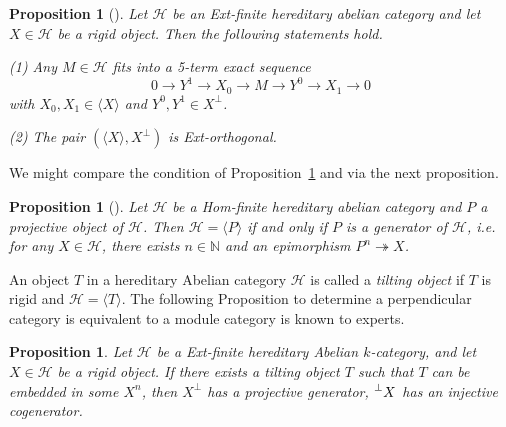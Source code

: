 \documentclass[a4paper, 11pt, reqno]{amsart}
\numberwithin{equation}{section}
\newtheorem{prop}[thm]{Proposition}
\theoremstyle{remark}
\theoremstyle{definition}
\begin{document}
\begin{prop}[{\cite[Proposition 3.3]{cheng2024wide}}] \label{perp_cal}
   Let $\mathcal H$ be an Ext-finite hereditary abelian category and let $X \in \mathcal H$ be a rigid object. Then the following statements hold. 
   
   (1) Any $M \in \mathcal H$ fits into a 5-term exact sequence
   \[
   0 \to Y^1 \to X_0 \to M \to Y^0 \to X_1 \to 0
   \]
   with $X_0,X_1 \in \langle X \rangle$ and $Y^0,Y^1 \in X^{\perp}$. 
   
   (2) The pair $(\langle X \rangle,X^{\perp})$ is Ext-orthogonal.
\end{prop}

We might compare the condition of Proposition~\ref{perp_cal} and  \cite[Proposition~A.1]{hubery2016categorification} via the next proposition.

\begin{prop} [{\cite[Proposition 3.6]{cheng2024wide}}] \label{proj_gen}
   Let $\mathcal H$ be a Hom-finite hereditary abelian category and $P$ a projective object of $\mathcal H$. Then $\mathcal H=\langle P \rangle$ if and only if $P$ is a generator of $\mathcal H$, i.e. for any $X \in \mathcal H$, there exists $n \in \mathbb N$ and an epimorphism $P^n \twoheadrightarrow X$.
\end{prop}

An object $T$ in a hereditary Abelian category $\mathcal H$ is called a \emph{tilting object} if $T$ is rigid and $\mathcal H=\langle T \rangle$. The following Proposition to determine a perpendicular category is equivalent to a module category is known to experts.

\begin{prop} \label{prop perp cat is module cat}
   Let $\mathcal H$ be a Ext-finite hereditary Abelian $k$-category, and let $X \in \mathcal H$ be a rigid object. If there exists a tilting object $T$ such that $T$ can be embedded in some $X^n$, then $X^{\perp}$ has a projective generator, $\prescript{\perp}{}{X}$ has an injective cogenerator.
\end{prop}
\end{document}

